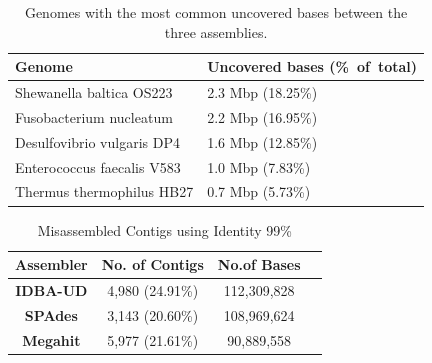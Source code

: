 \documentclass[10pt,a4paper,twocolumn]{article}
\begin{document}
\begin{table}[!h]
 \centering
 \caption{Genomes with the most common uncovered bases between the three assemblies.}
 \begin{tabular}{|p{4.50cm}|p{2.75cm}|} \hline
 \textbf{Genome} & \textbf{Uncovered bases (\%~of~total)} \\ \hline 
Shewanella baltica OS223 & 2.3 Mbp (18.25\%) \\ \hline
Fusobacterium nucleatum & 2.2 Mbp (16.95\%) \\ \hline
Desulfovibrio vulgaris DP4 & 1.6 Mbp (12.85\%) \\ \hline
Enterococcus faecalis V583 & 1.0 Mbp (7.83\%) \\ \hline
Thermus thermophilus HB27 & 0.7 Mbp (5.73\%) \\ \hline
\end{tabular}
\label{table:genomes_uncovered}
\end{table}




\begin{table}[t]
\caption{Misassembled Contigs using Identity 99\%}
\centering
\begin{tabular}{|c|c|c|c|}
\hline

\textbf{Assembler}& \textbf{No. of Contigs} &\textbf{No.of Bases} \\ [0.5ex] %
\hline
\textbf{IDBA-UD}& 4,980 (24.91\%) &112,309,828\\
\hline
\textbf{SPAdes} & 3,143 (20.60\%) &108,969,624 \\
\hline
\textbf{Megahit}& 5,977 (21.61\%) &90,889,558  \\
\hline
\end{tabular}
\label{table:misassembled} 
\end{table}
\end{document}
